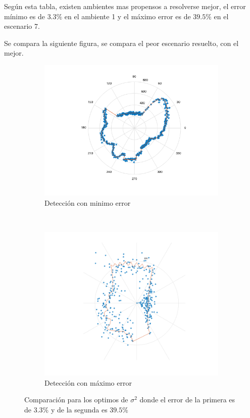 \documentclass[letterpaper,11pt]{article}
\begin{document}
Según esta tabla, existen ambientes mas propensos a resolverse mejor, el error mínimo es de $3.3 \%$ en el ambiente 1 y el máximo error es de $39.5 \%$ en el escenario 7.

Se compara la siguiente figura, se compara el peor escenario resuelto, con el mejor.


\begin{figure}[H]
    \centering
    \begin{subfigure}[b]{0.45\textwidth}
        \includegraphics[width=\textwidth]{img/parte_d/mejor.png}
        \caption{Detección con minimo error}
    \end{subfigure}
    ~ %
    \begin{subfigure}[b]{0.45\textwidth}
        \includegraphics[width=\textwidth]{img/parte_d/peor.png}
        \caption{Detección con máximo error}
    \end{subfigure}
    \caption{Comparación para los optimos de $\sigma^2$ donde el error de la primera es de $3.3 \%$ y de la segunda es $39.5\%$}
    \label{parted}
\end{figure}
\end{document}
